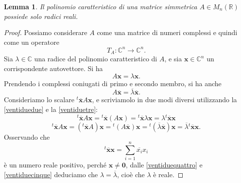 \documentclass{article}
\theoremstyle{plain}
\newtheorem{lem}[thm]{Lemma}
\theoremstyle{definition}
\theoremstyle{remark}
\begin{document}
\begin{bxthm}
\begin{lem}
Il polinomio caratteristico di una matrice simmetrica $A \in M_n(\mathbb{R})$ possiede solo radici reali.
\end{lem}    
\end{bxthm}
\begin{proof}
Possiamo considerare $A$ come una matrice di numeri complessi e quindi come un operatore 
\[T_A : \mathbb{C}^n \to \mathbb{C}^n. \]
Sia $\lambda \in \mathbb{C}$ una radice del polinomio caratteristico 
di $A$, e sia $\mathbf{x} \in \mathbb{C}^n$ un corrispondente autovettore. Si ha
\begin{equation}\label{ventiduedue}
A\mathbf{x} = \lambda \mathbf{x}.
\end{equation}
Prendendo i complessi coniugati di primo e secondo membro, si ha anche
\begin{equation}\label{ventiduetre}
A\overline{\mathbf{x}} = \overline{\lambda}\overline{\mathbf{x}}.
\end{equation}
Consideriamo lo scalare ${}^t\overline{\mathbf{x}}A\mathbf{x}$, e scriviamolo in due modi diversi 
utilizzando la \ref{ventiduedue} e la \ref{ventiduetre}:
\begin{equation}\label{ventiduequattro}
{}^t\overline{\mathbf{x}}A\mathbf{x} = {}^t\overline{\mathbf{x}}(A\mathbf{x}) = {}^t\overline{\mathbf{x}}\lambda\mathbf{x} = \lambda{}^t\overline{\mathbf{x}}\mathbf{x}    
\end{equation}
\begin{equation}\label{ventiduecinque}
{}^t\overline{\mathbf{x}}A\mathbf{x} = ({}^t\overline{\mathbf{x}}A)\mathbf{x} = {}^t(A\overline{\mathbf{x}})\mathbf{x} = {}^t(\overline{\lambda}\overline{\mathbf{x}})\mathbf{x}=\overline{\lambda}{}^t\overline{\mathbf{x}}\mathbf{x}.
\end{equation}
Osservando che
\[{}^t\overline{\mathbf{x}}\mathbf{x} = \sum_{i=1}^{n}\overline{x_i}x_i\]
è un numero reale positivo, perché $\mathbf{x} \neq \mathbf{0}$, dalle \ref{ventiduequattro} e \ref{ventiduecinque} deduciamo che 
$\lambda = \overline{\lambda}$, cioè che $\lambda$ è reale.
\end{proof}

\vspace{10pt}
\end{document}
